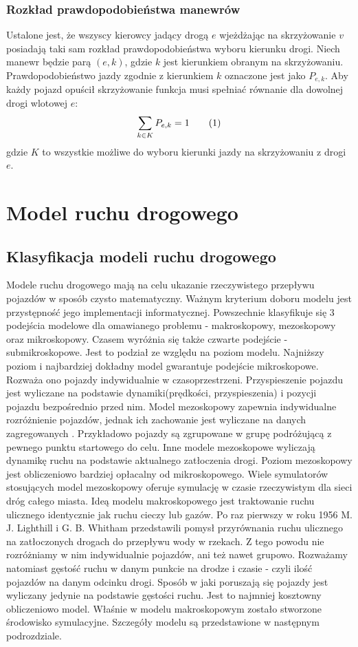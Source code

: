 \documentclass[12pt]{book}
\newcommand\addtag{\refstepcounter{equation}
\tag{\theequation}}
\begin{document}
\subsection{Rozkład prawdopodobieństwa manewrów}
Ustalone jest, że wszyscy kierowcy jadący drogą $e$ wjeżdżając na skrzyżowanie $v$ posiadają taki sam rozkład prawdopodobieństwa wyboru kierunku drogi.
Niech manewr  będzie parą $(e,k)$, gdzie $k$ jest kierunkiem obranym na skrzyżowaniu. Prawdopodobieństwo jazdy zgodnie z kierunkiem $k$ oznaczone jest jako  $P_{e,k}$. Aby każdy pojazd opuścił skrzyżowanie funkcja musi spełniać równanie dla dowolnej drogi wlotowej $e$: 
\[
\sum_{k\in K}P_{e,k}=1 \addtag
\]
gdzie $K$ to wszystkie możliwe do wyboru kierunki jazdy na skrzyżowaniu z drogi $e$.

\chapter{Model ruchu drogowego}
\section{Klasyfikacja modeli ruchu drogowego} 
Modele ruchu drogowego mają na celu ukazanie rzeczywistego przepływu pojazdów w sposób czysto matematyczny. Ważnym kryterium doboru modelu jest przystępność jego implementacji informatycznej. Powszechnie klasyfikuje się 3 podejścia modelowe dla omawianego problemu \cite{CompareModels} - makroskopowy, mezoskopowy oraz mikroskopowy. Czasem \cite{multilevel} wyróżnia się także czwarte podejście - submikroskopowe. Jest to podział ze względu na poziom modelu. Najniższy poziom i najbardziej dokładny model gwarantuje podejście mikroskopowe. Rozważa ono pojazdy indywidualnie w czasoprzestrzeni. Przyspieszenie pojazdu jest wyliczane na podstawie dynamiki(prędkości, przyspieszenia) i pozycji pojazdu bezpośrednio przed nim. Model mezoskopowy zapewnia indywidualne rozróżnienie pojazdów, jednak ich zachowanie jest wyliczane na danych zagregowanych \cite{mesoscopic}. Przykładowo pojazdy są zgrupowane w grupę podróżującą z pewnego punktu startowego do celu. Inne modele \cite{mesoscopic2} mezoskopowe wyliczają dynamikę ruchu na podstawie aktualnego zatłoczenia drogi. Poziom mezoskopowy jest obliczeniowo bardziej opłacalny od mikroskopowego.
Wiele symulatorów stosujących model mezoskopowy oferuje symulację w czasie rzeczywistym dla sieci dróg całego miasta\cite{vu2017high}. Ideą modelu makroskopowego jest traktowanie ruchu ulicznego identycznie jak ruchu cieczy lub gazów. Po raz pierwszy w roku 1956 M. J. Lighthill i G. B. Whitham \cite{lwr} przedstawili pomysł przyrównania ruchu ulicznego na zatłoczonych drogach do przepływu wody w rzekach. Z tego powodu nie rozróżniamy w nim indywidualnie pojazdów, ani też nawet grupowo. Rozważamy natomiast gęstość ruchu w danym punkcie na drodze i czasie - czyli ilość pojazdów na danym odcinku drogi. Sposób w jaki poruszają się pojazdy jest wyliczany jedynie na podstawie gęstości ruchu. Jest to najmniej kosztowny obliczeniowo model. Właśnie w modelu makroskopowym zostało stworzone środowisko symulacyjne. Szczegóły modelu są przedstawione w następnym podrozdziale.
\end{document}
